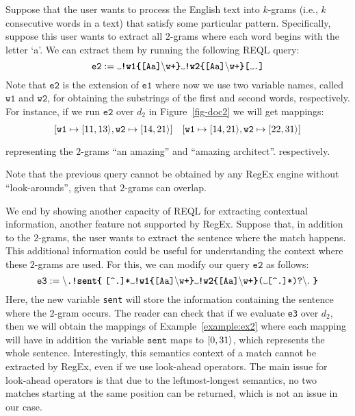 \begin{example} \label{example:ex2} Suppose that the user wants to process the
	English text into $k$-grams (i.e., $k$ consecutive words in a text) that
	satisfy some particular pattern. Specifically, suppose this user wants to
	extract all $2$-grams where each word begins with the letter `a'. We can
	extract them by running the following REQL query:
	$$
	\texttt{e2} := \Vtextvisiblespace \texttt{\textbf{!w1\{}[Aa]}\backslash \texttt{w+\textbf{\}}}\Vtextvisiblespace \texttt{\textbf{!w2\{}[Aa]}\backslash \texttt{w+\textbf{\}}[}\Vtextvisiblespace \texttt{.]}
	$$
	Note that $\texttt{e2}$ is the extension of $\texttt{e1}$ where now we use
	two variable names, called $\texttt{w1}$ and $\texttt{w2}$, for obtaining
	the substrings of the first and second words, respectively. For instance, if
	we run $\texttt{e2}$ over $d_2$ in Figure~\ref{fig-doc2} we will get
	mappings:
	$$
	\begin{array}{cc}
		[\texttt{w1} \mapsto \Span{11}{13}, \texttt{w2} \mapsto \Span{14}{21}] & 
		{[}\texttt{w1} \mapsto \Span{14}{21}, \texttt{w2} \mapsto \Span{22}{31}] \vspace{1mm}\\
	\end{array}
	$$
	representing the $2$-grams ``an amazing'' and ``amazing architect''.%
	respectively.
\end{example}
Note that the previous query cannot be obtained by any RegEx engine without
``look-arounds'', given that $2$-grams can overlap. %
\begin{example}\label{example:ex3} We end by showing another capacity of REQL
	for extracting contextual information, another feature not supported by
	RegEx. Suppose that, in addition to the $2$-grams, the user wants to extract
	the sentence where the match happens. This additional information could be
	useful for understanding the context where these $2$-grams are used. For
	this, we can modify our query $\texttt{e2}$ as follows:
$$
\texttt{e3}  :=  \backslash \texttt{.}\texttt{\textbf{!sent\{}} \ \texttt{[\textasciicircum .]*} \Vtextvisiblespace \texttt{\textbf{!w1\{}[Aa]}\backslash \texttt{w+\textbf{\}}}\Vtextvisiblespace \texttt{\textbf{!w2\{}[Aa]}\backslash \texttt{w+\textbf{\}}}  \texttt{(}\Vtextvisiblespace\texttt{[\textasciicircum .]*)?}\backslash .  \ \texttt{\textbf{\}}}
$$
	Here, the new variable \texttt{sent} will store the information containing
	the sentence where the $2$-gram occurs. The reader can check that if we
	evaluate \texttt{e3} over $d_2$, then we will obtain the mappings of
	Example~\ref{example:ex2} where each mapping will have in addition the
	variable $\texttt{sent}$ maps to $[0, 31\rangle$, which represents the whole
	sentence. Interestingly, this semantics context of a match cannot be
	extracted by RegEx, even if we use look-ahead operators. The main issue for
	look-ahead operators is that due to the leftmost-longest semantics, no two
	matches starting at the same position can be returned, which is not an issue
	in our case.
\end{example}

